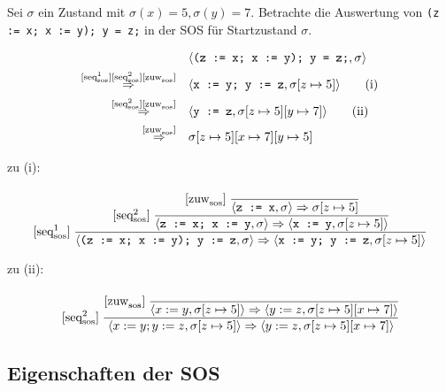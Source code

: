 \begin{example}
    Sei $\sigma$ ein Zustand mit $\sigma(x) = 5, \sigma(y) = 7$. Betrachte die Auswertung von \texttt{(z := x; x := y); y = z;} in der SOS für Startzustand $\sigma$.

    \begin{align*}
        & \langle \texttt{(z := x; x := y); y = z;}, \sigma \rangle \\
        \overset{\infruleSos[1]{seq}\infruleSos[2]{seq}\infruleSos{zuw}}{\Rightarrow} \quad & \langle \texttt{x := y; y := z}, \sigma[z \mapsto 5] \rangle \tag{i} \\
        \overset{\infruleSos[2]{seq}\infruleSos{zuw}}{\Rightarrow} \quad & \langle \texttt{y := z}, \sigma[z \mapsto 5][y \mapsto 7] \rangle \tag{ii} \\
        \overset{\infruleSos{zuw}}{\Rightarrow} \quad & \sigma[z \mapsto 5][x \mapsto 7][y \mapsto 5]
    \end{align*}

    zu (i):
    \begin{align*}
        \infruleSos[1]{seq}\; \cfrac{
            \infruleSos[2]{seq}\; \cfrac{
                \infruleSos{zuw}\; \cfrac{}{
                    \stranssos{\texttt{z := x}}{\sigma}{\sigma[z \mapsto 5]}
                }
            }{
                \stranssos{\texttt{z := x; x := y}}{\sigma}{\langle \texttt{x := y}, \sigma[z \mapsto 5] \rangle}
            }
        }{
            \stranssos{\texttt{(z := x; x := y); y := z}}{\sigma}{\langle \texttt{x := y; y := z}, \sigma[z \mapsto 5] \rangle}
        }
    \end{align*}

    zu (ii):
    \begin{align*}
        \infruleSos[2]{seq}\; \cfrac{
            \infruleSos{zuw}\; \cfrac{}{
                \stranssos{x :=y}{\sigma[z \mapsto 5]}{\langle y :=z, \sigma[z \mapsto5][x \mapsto 7] \rangle}
            }
        }{
            \stranssos{x :=y; y :=z}{\sigma[z \mapsto 5]}{\langle y :=z, \sigma[z \mapsto5][x \mapsto 7] \rangle}
        }
    \end{align*}
\end{example}



\subsection{Eigenschaften der SOS}

